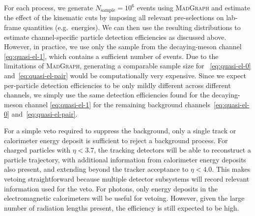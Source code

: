 \documentclass[aps,prd,preprintnumbers,superscriptaddress,nofootinbib,floatfix,twocolumn,notitlepage,reprint]{revtex4-2}
\begin{document}
For each process, we generate $N_{\text{sample}} = 10^{6}$ events using \textsc{MadGraph} and estimate the effect of the kinematic cuts by imposing all relevant pre-selections on lab-frame quantities (e.g.\ energies).
We can then use the resulting distributions to estimate channel-specific particle detection efficiencies as discussed above.
However, in practice, we use only the sample from the decaying-meson channel \eqref{eq:quasi-el-1}, which contains a sufficient number of events.
Due to the limitations of \textsc{MadGraph}, generating a comparable sample size for ~\eqref{eq:quasi-el-0} and~\eqref{eq:quasi-el-pair} would be computationally very expensive. 
Since we expect per-particle detection efficiencies to be only mildly different across different channels, we simply use the same detection efficiencies found for the decaying-meson channel \eqref{eq:quasi-el-1} for the remaining background channels~\eqref{eq:quasi-el-0} and~\eqref{eq:quasi-el-pair}.

For a simple veto required to suppress the background, only a single track or calorimeter energy deposit is sufficient to reject a background process. 
For charged particles with $\eta < 3.7$, the tracking detectors will be able to reconstruct a particle trajectory, with additional information from calorimeter energy deposits also present, and extending beyond the tracker acceptance to $\eta < 4.0$. 
This makes vetoing straightforward because multiple detector subsystems will record relevant information used for the veto. 
For photons, only energy deposits in the electromagnetic calorimeters will be useful for vetoing. However, given the large number of radiation lengths present, the efficiency is still expected to be high.
\end{document}
